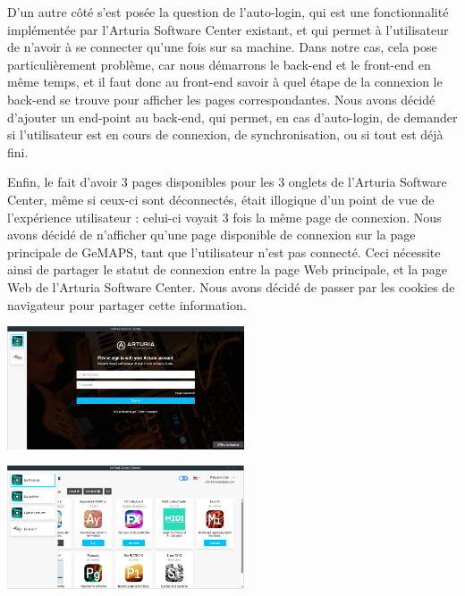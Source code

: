 \documentclass[francais]{rapportPFE}  %
\begin{document}
D'un autre côté s'est posée la question de l'auto-login, qui est une fonctionnalité implémentée par l'Arturia Software Center existant, et qui permet à l'utilisateur de n'avoir à se connecter qu'une fois sur sa machine. Dans notre cas, cela pose particulièrement problème, car nous démarrons le back-end et le front-end en même temps, et il faut donc au front-end savoir à quel étape de la connexion le back-end se trouve pour afficher les pages correspondantes. Nous avons décidé d'ajouter un end-point au back-end, qui permet, en cas d'auto-login, de demander si l'utilisateur est en cours de connexion, de synchronisation, ou si tout est déjà fini.

Enfin, le fait d'avoir 3 pages disponibles pour les 3 onglets de l'Arturia Software Center, même si ceux-ci sont déconnectés, était illogique d'un point de vue de l'expérience utilisateur : celui-ci voyait 3 fois la même page de connexion. Nous avons décidé de n'afficher qu'une page disponible de connexion sur la page principale de GeMAPS, tant que l'utilisateur n'est pas connecté. Ceci nécessite ainsi de partager le statut de connexion entre la page Web principale, et la page Web de l'Arturia Software Center. Nous avons décidé de passer par les cookies de navigateur pour partager cette information.

\begin{center}
    \centering
    \begin{minipage}{.5\textwidth}
    \centering
    \includegraphics[width=7cm]{graphics/disconnected.png}
    \label{fig:test1}
    \end{minipage}%
    \begin{minipage}{.5\textwidth}
    \centering
    \includegraphics[width=7cm]{graphics/connected.png}
    \label{fig:test2}
    \end{minipage}
    \end{center}
\end{document}
